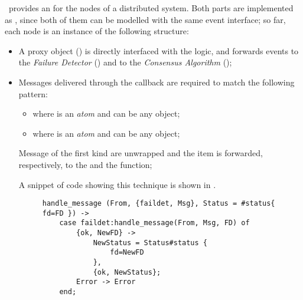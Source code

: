 \YUNA\ provides an  for the nodes of a
distributed system. Both parts are implemented as , since both of them can be modelled with the same event
interface; so far, each node is an instance of the following structure:
\begin{itemize}

    \item   A proxy object () is directly interfaced
            with the  logic, and forwards
            events to the \emph{Failure Detector} () and
            to the \emph{Consensus Algorithm} ();

    \item   Messages delivered through the 
            callback are required to match the following pattern:

        \begin{itemize}

        \item   {} where  is an
                \emph{atom} and  can be any object;

        \item   {} where  is an
                \emph{atom} and  can be any object;

        \end{itemize}

            Message of the first kind are unwrapped and the 
            item is forwarded, respectively, to the
             and the
             function;

            A snippet of code showing this technique is shown in
            .

            \begin{figure}[hbt]
            \begin{lstlisting}[caption={Proxying for the failure detector},
                               label={code:Proxying}]
handle_message (From, {faildet, Msg}, Status = #status{ fd=FD }) ->
    case faildet:handle_message(From, Msg, FD) of
        {ok, NewFD} ->
            NewStatus = Status#status {
                fd=NewFD
            },
            {ok, NewStatus};
        Error -> Error
    end;
            \end{lstlisting}
            \end{figure}


\end{itemize}
